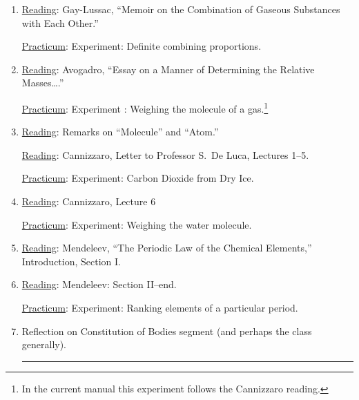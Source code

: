 \documentclass{article}
\newcommand{\rd}{\uline{Reading}}
\newcommand{\pc}{\uline{Practicum}}
\begin{document}
\begin{enumerate}
\rd: Thomson, Extracts from \emph{System of Chemistry}.
 Appendix 2: Berthollet and Proust.  

\pc: \label{multiple}Experiment: Multiple combining proportions.\footnote{\label{reversed}The order of practica on days \ref{multiple} and \ref{definite} is sometimes reversed.} %

\item \rd: Gay-Lussac, ``Memoir on the Combination of Gaseous Substances with Each Other.'' 

\pc: \label{definite}Experiment: Definite combining proportions.
	
\item \rd: Avogadro, ``Essay on a Manner of Determining the Relative Masses\dots.''  

	\pc: Experiment : Weighing the
molecule of a gas.\footnote{In the current manual this experiment follows the Cannizzaro reading.}

\item \rd: Remarks on ``Molecule'' and ``Atom.''

\rd: Cannizzaro, Letter to Professor S.\ De Luca, Lectures 1--5. 

\pc: Experiment: Carbon Dioxide from Dry Ice.

\item \rd: Cannizzaro, Lecture 6  

\pc: Experiment: Weighing the water molecule.

\item \rd: Mendeleev, ``The Periodic Law of the Chemical Elements,'' Introduction, Section I.

\item \rd: Mendeleev: Section II--end.  

	\pc: Experiment: Ranking elements of a particular period.
	
\item Reflection on Constitution of Bodies segment (and perhaps the class generally). \rule{1.2ex}{1.2ex}

\end{enumerate}

















\end{document}
